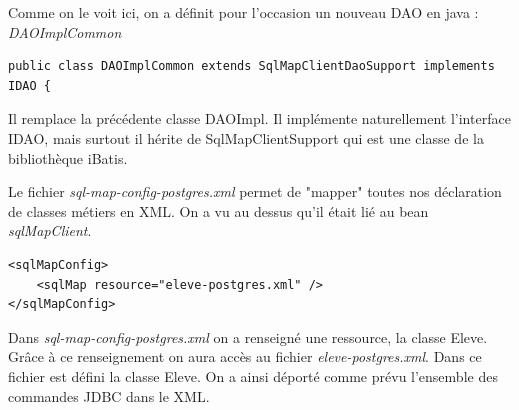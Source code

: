 \documentclass[a4paper,12pt]{article}
\begin{document}
Comme on le voit ici, on a définit pour l'occasion un nouveau DAO en java : \textit{DAOImplCommon}

\begin{lstlisting}
public class DAOImplCommon extends SqlMapClientDaoSupport implements IDAO {
\end{lstlisting}

Il remplace la précédente classe DAOImpl.
Il implémente naturellement l'interface IDAO, mais surtout il hérite de SqlMapClientSupport qui est une classe de la bibliothèque iBatis.

Le fichier  \textit{sql-map-config-postgres.xml} permet de "mapper" toutes nos déclaration de classes métiers en XML. On a vu au dessus qu'il était lié au bean
\textit{sqlMapClient}. 

\begin{lstlisting}
<sqlMapConfig>
	<sqlMap resource="eleve-postgres.xml" />
</sqlMapConfig>
\end{lstlisting}

Dans \textit{sql-map-config-postgres.xml} on a renseigné une ressource, la classe Eleve. Grâce à ce renseignement on aura accès au fichier \textit{eleve-postgres.xml}. Dans ce fichier est défini la classe Eleve. On a ainsi déporté comme prévu l'ensemble des commandes JDBC dans le XML.
\end{document}
